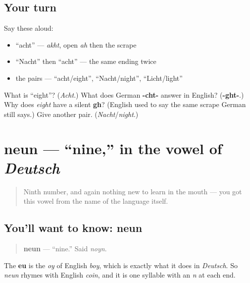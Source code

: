 \subsection*{Your turn}
Say these aloud:

\begin{itemize}
\raggedright
  \item \textquotedblleft{}acht\textquotedblright{} — \emph{akht}, open \emph{ah} then the scrape
  \item \textquotedblleft{}Nacht\textquotedblright{} then \textquotedblleft{}acht\textquotedblright{} — the same ending twice
  \item the pairs — \textquotedblleft{}acht/eight\textquotedblright{}, \textquotedblleft{}Nacht/night\textquotedblright{}, \textquotedblleft{}Licht/light\textquotedblright{}
\end{itemize}

\begin{tcolorbox}[breakable,colback=teal!4,colframe=teal!35!black,title={Before you move on}]
What is \textquotedblleft{}eight\textquotedblright{}? (\emph{Acht}.) What does German \textbf{-cht-} answer in English? (\textbf{-ght-}.) Why does \emph{eight} have a silent \textbf{gh}? (English used to say the same scrape German still says.) Give another pair. (\emph{Nacht}/\emph{night}.)
\end{tcolorbox}
\section[neun]{neun — \textquotedblleft{}nine,\textquotedblright{} in the vowel of \emph{Deutsch}}

\label{lesson:GE-C06-neun}



\begin{quote}
Ninth number, and again nothing new to learn in the mouth — you got this vowel from the name of the language itself.
\end{quote}

\subsection*{You'll want to know: neun}
\begin{quote}
\textbf{neun} — \textquotedblleft{}nine.\textquotedblright{} Said \emph{noyn}.
\end{quote}

The \textbf{eu} is the \emph{oy} of English \emph{boy}, which is exactly what it does in \emph{Deutsch}. So \emph{neun} rhymes with English \emph{coin}, and it is one syllable with an \emph{n} at each end.

